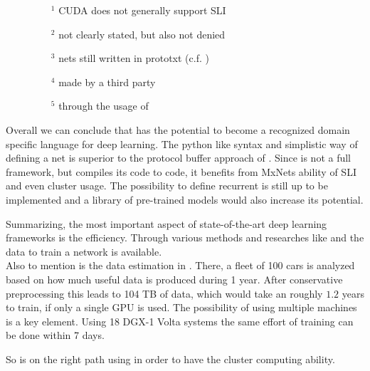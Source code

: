 \vspace{-1em}
\begin{figure}[H]
	\footnotesize
	\begin{multicols}{2}
	\begin{itemize}
		\item[$^1$] CUDA does not generally support SLI
		\item[$^2$] not clearly stated, but also not denied
		\item[$^3$] nets still written in prototxt (c.f. )
		\item[$^4$] made by a third party\cite{CaffeOnSpark}
		\item[$^5$] through the usage of \mxnet
	\end{itemize}
	\end{multicols}
\end{figure}

Overall we can conclude that \cnnarch has the potential to become a recognized domain specific language for deep learning. The python like syntax and simplistic way of defining a net is superior to the protocol buffer approach of \caffe. Since \cnnarch is not a full framework, but compiles its code to \mxnet code, it benefits from MxNets ability of SLI and even cluster usage. The possibility to define recurrent \nns is still up to be implemented and a library of pre-trained models would also increase its potential.

Summarizing, the most important aspect of state-of-the-art deep learning frameworks is the efficiency. Through various methods and researches like \kitti and \torcs the data to train a network is available.\\
Also to mention is the data estimation in \cite{grzywaczewski2017training}. There, a fleet of 100 cars is analyzed based on how much useful data is produced during 1 year. After conservative preprocessing this leads to 104 TB of data, which would take an \alexnet roughly $1.2$ years to train, if only a single GPU is used. The possibility of using multiple machines is a key element. Using 18 DGX-1 Volta systems the same effort of training can be done within 7 days.

So \cnnarch is on the right path using \mxnet in order to have the cluster computing ability.



